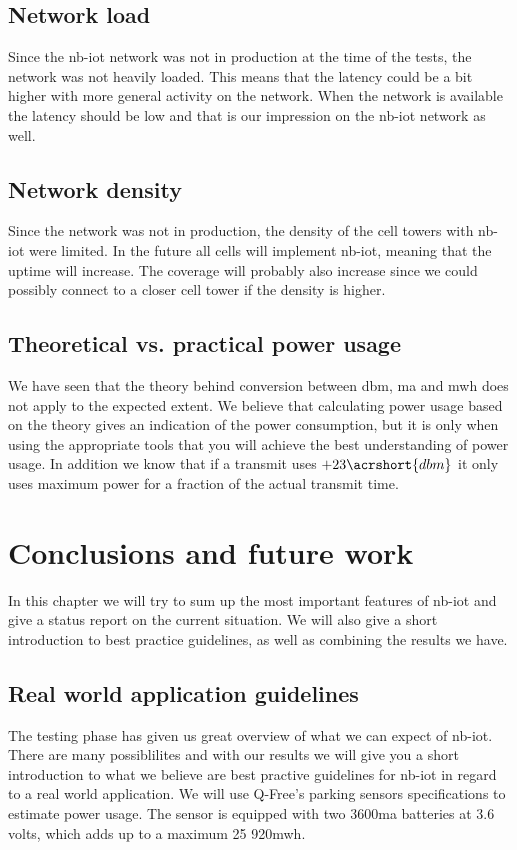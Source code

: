 \documentclass[USenglish]{ifimaster}  %
\begin{document}
\section{Network load}
Since the \acrshort{nb-iot} network was not in production at the time of the tests, the network was not heavily loaded. This means that the latency could be a bit higher with more general activity on the network. When the network is available the latency should be low and that is our impression on the \acrshort{nb-iot} network as well.

\section{Network density}
Since the network was not in production, the density of the cell towers with \acrshort{nb-iot} were limited. In the future all cells will implement \acrshort{nb-iot}, meaning that the uptime will increase. The coverage will probably also increase since we could possibly connect to a closer cell tower if the density is higher.

\section{Theoretical vs. practical power usage}
We have seen that the theory behind conversion between \acrshort{dbm}, \acrshort{ma} and \acrshort{mwh} does not apply to the expected extent. We believe that calculating power usage based on the theory gives an indication of the power consumption, but it is only when using the appropriate tools that you will achieve the best understanding of power usage. In addition we know that if a transmit uses ${+23 \acrshort{dbm}}$ it only uses maximum power for a fraction of the actual transmit time.

\chapter{Conclusions and future work}                     %
In this chapter we will try to sum up the most important features of \acrshort{nb-iot} and give a status report on the current situation. We will also give a short introduction to best practice guidelines, as well as combining the results we have.

\section{Real world application guidelines} \label{section:guidelines}
The testing phase has given us great overview of what we can expect of \acrshort{nb-iot}. There are many possiblilites and with our results we will give you a short introduction to what we believe are best practive guidelines for \acrshort{nb-iot} in regard to a real world application. We will use Q-Free's parking sensors specifications to estimate power usage. The sensor is equipped with two 3600\acrshort{ma} batteries at 3.6 volts, which adds up to a maximum 25 920\acrshort{mwh}.
\end{document}
